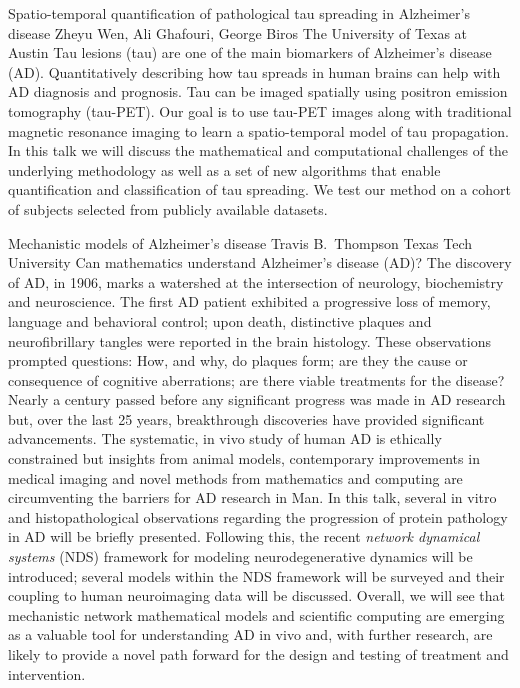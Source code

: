 \vspace{1.5ex}
\abs
{Spatio-temporal quantification of pathological tau spreading in Alzheimer's disease}
{Zheyu Wen, Ali Ghafouri, George Biros}
{The University of Texas at Austin}
{Tau lesions (tau) are one of the main biomarkers of Alzheimer's disease (AD). Quantitatively describing how tau spreads in human brains can help with AD diagnosis and prognosis. Tau can be imaged spatially using positron emission tomography (tau-PET). Our goal is to use tau-PET images along with traditional magnetic resonance imaging to learn a spatio-temporal model of tau propagation. In this talk we will discuss the mathematical and computational challenges of the underlying methodology as well as a set of new algorithms that enable quantification and classification of tau spreading. We test our method on a cohort of subjects selected from publicly available datasets.}


\vspace{1.5ex}
\abs
{Mechanistic models of Alzheimer's disease}
{Travis B.~Thompson}
{Texas Tech University}
{Can mathematics understand Alzheimer's disease (AD)?  The discovery of AD, in 1906, marks a watershed at the intersection of neurology, biochemistry and neuroscience.  The first AD patient exhibited a progressive loss of memory, language and behavioral control; upon death, distinctive plaques and neurofibrillary tangles were reported in the brain histology.  These observations prompted questions: How, and why, do plaques form; are they the cause or consequence of cognitive aberrations; are there viable treatments for the disease? Nearly a century passed before any significant progress was made in AD research but, over the last 25 years, breakthrough discoveries have provided significant advancements. The systematic, in vivo study of human AD is ethically constrained but insights from animal models, contemporary improvements in medical imaging and novel methods from mathematics and computing are circumventing the barriers for AD research in Man. In this talk, several in vitro and histopathological observations regarding the progression of protein pathology in AD will be briefly presented.  Following this, the recent \textit{network dynamical systems} (NDS) framework for modeling neurodegenerative dynamics will be introduced; several models within the NDS framework will be surveyed and their coupling to human neuroimaging data will be discussed.  Overall, we will see that mechanistic network mathematical models and scientific computing are emerging as a valuable tool for understanding AD in vivo and, with further research, are likely to provide a novel path forward for the design and testing of treatment and intervention.}


